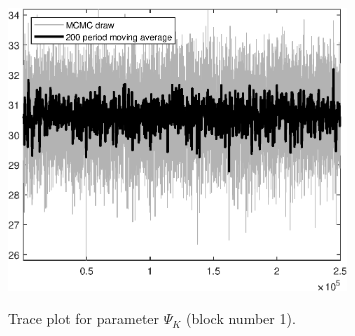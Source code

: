 \begin{figure}[H]
\centering
  \includegraphics[width=0.8\textwidth]{BRS_growth_ext_comovement/graphs/TracePlot_Psi_K_blck_1}\\
    \caption{Trace plot for parameter ${\Psi_K}$ (block number 1).}
\end{figure}

